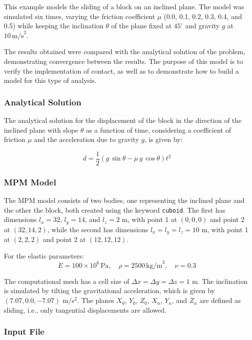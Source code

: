 This example models the sliding of a block on an inclined plane.  
The model was simulated six times, varying the friction coefficient $\mu$ (0.0, 0.1, 0.2, 0.3, 0.4, and 0.5) while keeping the inclination $\theta$ of the plane fixed at $45^{\circ}$ and gravity $g$ at $10 \, \text{m/s}^2$.  

The results obtained were compared with the analytical solution of the problem, demonstrating convergence between the results.  
The purpose of this model is to verify the implementation of contact, as well as to demonstrate how to build a model for this type of analysis.

\subsubsection*{Analytical Solution}

The analytical solution for the displacement of the block in the direction of the inclined plane with slope $\theta$ as a function of time, considering a coefficient of friction $\mu$ and the acceleration due to gravity $g$, is given by:

\begin{equation}
    d = \frac{1}{2} \left( g \, \sin{\theta} - \mu \, g \, \cos{\theta} \right) t^2
\end{equation}

\subsubsection*{MPM Model}

The MPM model consists of two bodies, one representing the inclined plane and the other the block, both created using the keyword \texttt{cuboid}. 
The first has dimensions $l_x = 32$, $l_y = 14$, and $l_z = 2$ m, with point 1 at $(0,0,0)$ and point 2 at $(32, 14, 2)$, 
while the second has dimensions $l_x = l_y = l_z = 10$ m, with point 1 at $(2,2,2)$ and point 2 at $(12, 12, 12)$.

For the elastic parameters:
\[
E = 100 \times 10^6\,\text{Pa}, \quad \rho = 2500\,\text{kg/m}^3, \quad \nu = 0.3
\]

The computational mesh has a cell size of $\Delta x = \Delta y = \Delta z = 1$ m. The inclination is simulated by tilting the gravitational acceleration, 
which is given by $(7.07, 0.0, -7.07)$ m/s$^2$. The planes $X_0$, $Y_0$, $Z_0$, $X_n$, $Y_n$, and $Z_n$ are defined as sliding, i.e., only tangential displacements are allowed.

\subsubsection*{Input File}


